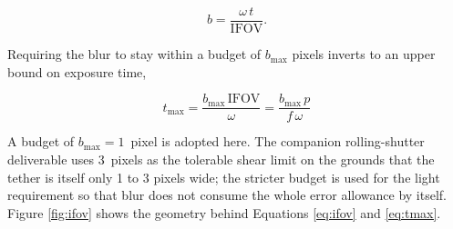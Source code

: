 \begin{equation}
b = \frac{\omega\,t}{\mathrm{IFOV}} .
\label{eq:blur}
\end{equation}

Requiring the blur to stay within a budget of $b_{\max}$ pixels inverts to an upper bound on exposure time,

\begin{equation}
\boxed{\;t_{\max} = \frac{b_{\max}\,\mathrm{IFOV}}{\omega} = \frac{b_{\max}\,p}{f\,\omega}\;}
\label{eq:tmax}
\end{equation}

A budget of $b_{\max} = 1$~pixel is adopted here. The companion rolling-shutter deliverable uses 3~pixels as the tolerable shear limit on the grounds that the tether is itself only 1 to 3 pixels wide; the stricter budget is used for the light requirement so that blur does not consume the whole error allowance by itself. Figure \ref{fig:ifov} shows the geometry behind Equations \ref{eq:ifov} and \ref{eq:tmax}.

